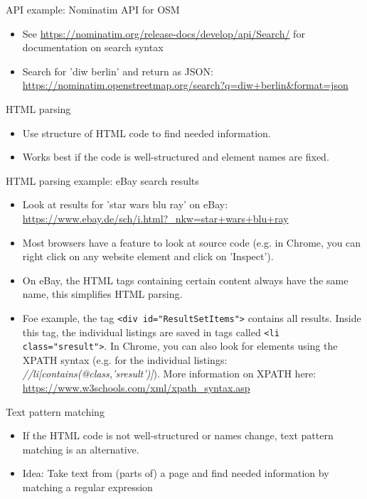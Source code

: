 \begin{frame}{API example: Nominatim API for OSM}
\begin{itemize}
	\item See \url{https://nominatim.org/release-docs/develop/api/Search/} for documentation on search syntax
	\item Search for 'diw berlin' and return as JSON: \url{https://nominatim.openstreetmap.org/search?q=diw+berlin&format=json}
\end{itemize}

\end{frame}

\begin{frame}{HTML parsing}
\begin{itemize}
	\item Use structure of HTML code to find needed information.
	\item Works best if the code is well-structured and element names are fixed.
\end{itemize}
\end{frame}

\begin{frame}{HTML parsing example: eBay search results}
\begin{itemize}
	\item Look at results for 'star wars blu ray' on eBay: \url{https://www.ebay.de/sch/i.html?_nkw=star+wars+blu+ray}
	\item Most browsers have a feature to look at source code (e.g. in Chrome, you can right click on any website element and click on 'Inspect').
	\item On eBay, the HTML tags containing certain content always have the same name, this simplifies HTML parsing.
	\item Foe example, the tag \texttt{<div id="ResultSetItems">} contains all results. Inside this tag, the individual listings are saved in tags called \texttt{<li class="sresult">}. In Chrome, you can also look for elements using the XPATH syntax (e.g. for the individual listings: \textit{//li[contains(@class,'sresult')]}). More information on XPATH here: \url{https://www.w3schools.com/xml/xpath_syntax.asp}
\end{itemize}
\end{frame}

\begin{frame}{Text pattern matching}
\begin{itemize}
	\item If the HTML code is not well-structured or names change, text pattern matching is an alternative.
	\item Idea: Take text from (parts of) a page and find needed information by matching a regular expression
\end{itemize}
\end{frame}

